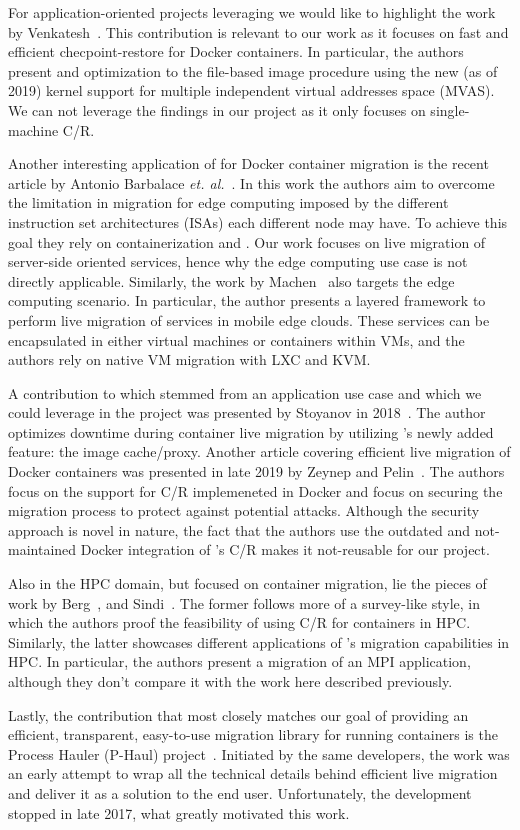 For application-oriented projects leveraging \criu we would like to highlight the work by Venkatesh~\cite{Venkatesh2019}.
This contribution is relevant to our work as it focuses on fast and efficient checpoint-restore for Docker containers.
In particular, the authors present and optimization to the file-based image procedure using the new (as of 2019) kernel support for multiple independent virtual addresses space (MVAS).
We can not leverage the findings in our project as it only focuses on single-machine C/R.

Another interesting application of \criu for Docker container migration is the recent article by Antonio Barbalace \textit{et. al.}~\cite{Barbalace2020}.
In this work the authors aim to overcome the limitation in migration for edge computing imposed by the different instruction set architectures (ISAs) each different node may have.
To achieve this goal they rely on containerization and \criu.
Our work focuses on live migration of server-side oriented services, hence why the edge computing use case is not directly applicable.
Similarly, the work by Machen~\cite{Machen2018} also targets the edge computing scenario.
In particular, the author presents a layered framework to perform live migration of services in mobile edge clouds.
These services can be encapsulated in either virtual machines or containers within VMs, and the authors rely on native VM migration with LXC and KVM.

A contribution to \criu which stemmed from an application use case and which we could leverage in the project was presented by Stoyanov in 2018~\cite{Stoyanov2018}.
The author optimizes downtime during container live migration by utilizing \criu's newly added feature: the image cache/proxy.
Another article covering efficient live migration of Docker containers was presented in late 2019 by Zeynep and Pelin~\cite{Zeynep2019}.
The authors focus on the support for C/R implemeneted in Docker and focus on securing the migration process to protect against potential attacks.
Although the security approach is novel in nature, the fact that the authors use the outdated and not-maintained Docker integration of \criu's C/R makes it not-reusable for our project.

Also in the HPC domain, but focused on container migration, lie the pieces of work by Berg~\cite{Berg2017}, and Sindi~\cite{Sindi2019}.
The former follows more of a survey-like style, in which the authors proof the feasibility of using C/R for containers in HPC.
Similarly, the latter showcases different applications of \criu's migration capabilities in HPC.
In particular, the authors present a migration of an MPI application, although they don't compare it with the work here described previously.

Lastly, the contribution that most closely matches our goal of providing an efficient, transparent, easy-to-use migration library for running containers is the Process Hauler (P-Haul) project~\cite{phaul-criu,phaul-github}.
Initiated by the same \criu developers, the work was an early attempt to wrap all the technical details behind efficient live migration and deliver it as a solution to the end user.
Unfortunately, the development stopped in late 2017, what greatly motivated this work.
